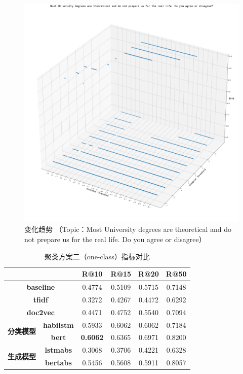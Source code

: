 \documentclass[11pt]{article}
\begin{document}
\begin{CJK}{UTF8}{gkai}
\begin{figure}[htbp]\small
  \centering
  \includegraphics[width=1.0\linewidth]{MostUniversityDegreesAreTheoreticalAndDoNotPrepareUsForTheRealLifeDoYouAgreeOrDisagree_.png}
  \caption{变化趋势 （Topic：Most University degrees are theoretical and do not prepare us for the real life. Do you agree or disagree）}
  \label{framework}
\end{figure}

\begin{table}[htbp]
  \centering
  \begin{tabular}{c|c|c|c|c|c}
    \hline
    \multicolumn{2}{c|}{} & \textbf{R@10} & \textbf{R@15} & \textbf{R@20} & \textbf{R@50} \\
    \hline
    \multicolumn{2}{c|}{\textbf{baseline}} & 0.4774  & 0.5109  & 0.5715  & 0.7148  \\
    \hline
    \multicolumn{2}{c|}{\textbf{tfidf}} & 0.3272  & 0.4267  & 0.4472  & 0.6292  \\
    \hline
    \multicolumn{2}{c|}{\textbf{doc2vec}} & 0.4471  & 0.4752  & 0.5540  & 0.7094  \\
    \hline
    \multirow{2}[0]{*}{\textbf{分类模型}} & \textbf{habilstm} & 0.5933  & 0.6062  & 0.6062  & 0.7184  \\
    & \textbf{bert} & \textcolor[rgb]{ 1,  0,  0}{\textbf{0.6062 }} & 0.6365  & 0.6971  & 0.8200  \\
    \hline
    \multirow{2}[0]{*}{\textbf{生成模型}} & \textbf{lstmabs} & 0.3068  & 0.3706  & 0.4221  & 0.6328  \\
    & \textbf{bertabs} & 0.5456  & 0.5608  & 0.5911  & 0.8057  \\
    \hline
  \end{tabular}%
  \caption{聚类方案二（one-class）指标对比}
  \label{tab:addlabel}%
\end{table}%


\end{CJK}
\end{document}
